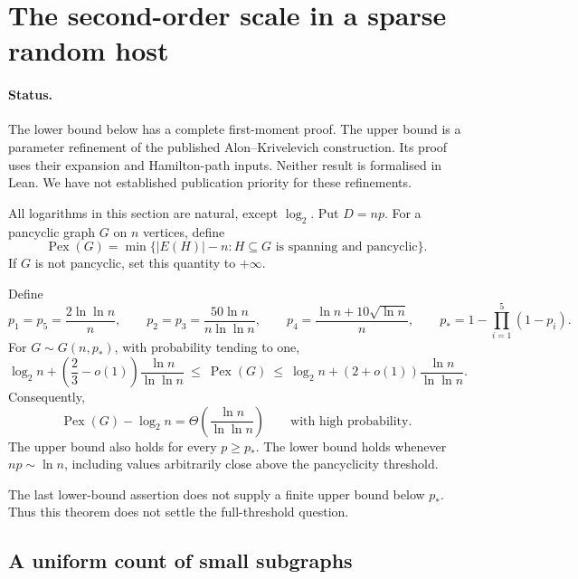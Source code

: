 \section{The second-order scale in a sparse random host}
\label{sec:research-random-hosts}

\paragraph{Status.}
The lower bound below has a complete first-moment proof.
The upper bound is a parameter refinement of the published Alon--Krivelevich construction.
Its proof uses their expansion and Hamilton-path inputs.
Neither result is formalised in Lean.
We have not established publication priority for these refinements.

All logarithms in this section are natural, except $\log_2$.
Put $D=np$.
For a pancyclic graph $G$ on $n$ vertices, define
\[
 \operatorname{Pex}(G)
 =\min\{|E(H)|-n:H\subseteq G\text{ is spanning and pancyclic}\}.
\]
If $G$ is not pancyclic, set this quantity to $+\infty$.

\begin{theorem}
\label{thm:rhost-scale}
Define
\[
 p_1=p_5=\frac{2\ln\ln n}{n},\qquad
 p_2=p_3=\frac{50\ln n}{n\ln\ln n},\qquad
 p_4=\frac{\ln n+10\sqrt{\ln n}}{n},
 \qquad p_* =1-\prod_{i=1}^{5}(1-p_i).
\]
For $G\sim G(n,p_*)$, with probability tending to one,
\[
 \log_2 n+\left(\frac23-o(1)\right)\frac{\ln n}{\ln\ln n}
 \ \le\ \operatorname{Pex}(G)
 \ \le\ \log_2 n+(2+o(1))\frac{\ln n}{\ln\ln n}.
\]
Consequently,
\[
 \operatorname{Pex}(G)-\log_2 n
 =\Theta\!\left(\frac{\ln n}{\ln\ln n}\right)
 \qquad\text{with high probability.}
\]
The upper bound also holds for every $p\ge p_*$.
The lower bound holds whenever $np\sim\ln n$, including values arbitrarily close above the pancyclicity threshold.
\end{theorem}

The last lower-bound assertion does not supply a finite upper bound below $p_*$.
Thus this theorem does not settle the full-threshold question.

\subsection{A uniform count of small subgraphs}

